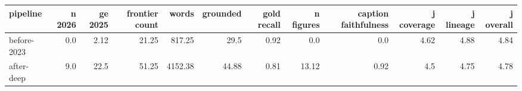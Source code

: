 \begin{tabular}{lrrrrrrrrrrr}
\toprule
pipeline & n 2026 & ge 2025 & frontier count & words & grounded & gold recall & n figures & caption faithfulness & j coverage & j lineage & j overall \\
\midrule
before-2023 & 0.0 & 2.12 & 21.25 & 817.25 & 29.5 & 0.92 & 0.0 & 0.0 & 4.62 & 4.88 & 4.84 \\
after-deep & 9.0 & 22.5 & 51.25 & 4152.38 & 44.88 & 0.81 & 13.12 & 0.92 & 4.5 & 4.75 & 4.78 \\
\bottomrule
\end{tabular}
